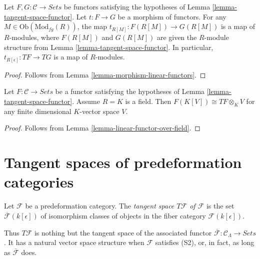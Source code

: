\begin{lemma}
\label{lemma-morphism-tangent-spaces}
Let $F, G: \mathcal{C} \to \textit{Sets}$ be functors satisfying 
the hypotheses of
Lemma \ref{lemma-tangent-space-functor}.
Let $t : F \to G$ be a morphism of functors. For any
$M \in \text{Ob}(\text{Mod}_{fg}(R))$, the map
$t_{R[M]}: F(R[M]) \to G(R[M])$ is a map of $R$-modules, where
$F(R[M])$ and $G(R[M])$ are given the $R$-module structure from
Lemma \ref{lemma-tangent-space-functor}.  
In particular, $t_{R[\epsilon]} : TF \to TG$ is a map of $R$-modules.
\end{lemma}

\begin{proof}
Follows from
Lemma \ref{lemma-morphism-linear-functors}.
\end{proof}

\begin{lemma}
\label{lemma-tangent-space-tensor}
Let $F: \mathcal{C} \to \textit{Sets}$ be a functor satisfying the 
hypotheses of
Lemma \ref{lemma-tangent-space-functor}.
Assume $R = K$ is a field. Then $F(K[V]) \cong TF \otimes_K V$
for any finite dimensional $K$-vector space $V$.
\end{lemma}

\begin{proof}
Follows from
Lemma \ref{lemma-linear-functor-over-field}.
\end{proof}






\section{Tangent spaces of predeformation categories}
\label{section-tangent-spaces}

\begin{definition}
\label{definition-tangent-space}
Let $\mathcal{F}$ be a predeformation category.  The {\it tangent space $T 
\mathcal{F}$ of $\mathcal{F}$} is the set $\overline{\mathcal{F}}(k[\epsilon])$ 
of isomorphism classes of objects in the fiber category $\mathcal 
F(k[\epsilon])$.
\end{definition}

\noindent
Thus $T \mathcal{F}$ is nothing but the tangent space of the associated functor 
$\overline{\mathcal{F}}: \mathcal{C}_\Lambda \to \textit{Sets}$. 
It has a natural vector space structure when $\mathcal{F}$ satisfies (S2), or, 
in fact, as long as $\overline{\mathcal{F}}$ does.

